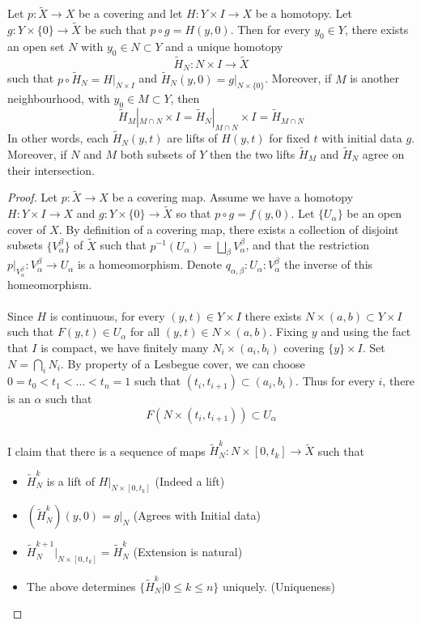 \documentclass[a4paper]{article}
\begin{document}
\begin{lmm}{}{} Let $p:\tilde{X}\to X$ be a covering and let $H:Y\times I\to X$ be a homotopy. Let $g:Y\times\{0\}\to\tilde{X}$ be such that $p\circ g=H(y,0)$. Then for every $y_0\in Y$, there exists an open set $N$ with $y_0\in N\subset Y$ and a unique homotopy $$\tilde{H}_N:N\times I\to\tilde{X}$$ such that $p\circ\tilde{H}_N=H|_{N\times I}$ and $\tilde{H}_N(y,0)=g|_{N\times\{0\}}$. Moreover, if $M$ is another neighbourhood, with $y_0\in M\subset Y$, then $$\tilde{H}_M|_{M\cap N}\times I=\tilde{H}_N|_{M\cap N}\times I=\tilde{H}_{M\cap N}$$
In other words, each $\tilde{H}_N(y,t)$ are lifts of $H(y,t)$ for fixed $t$ with initial data $g$. Moreover, if $N$ and $M$ both subsets of $Y$ then the two lifts $\tilde{H}_M$ and $\tilde{H}_N$ agree on their intersection. \tcbline
\begin{proof}
Let $p:\tilde{X}\to X$ be a covering map. Assume we have a homotopy $H:Y\times I\to X$ and $g:Y\times\{0\}\to\tilde{X}$ so that $p\circ g=f(y,0)$. Let $\{U_\alpha\}$ be an open cover of $X$. By definition of a covering map, there exists a collection of disjoint subsets $\{V_\alpha^\beta\}$ of $\tilde{X}$ such that $p^{-1}(U_\alpha)=\bigsqcup_{\beta}V_{\alpha}^\beta$, and that the restriction $p|_{V_\alpha^\beta}:V_\alpha^\beta\to U_\alpha$ is a homeomorphism. Denote $q_{\alpha,\beta}:U_\alpha:V_\alpha^\beta$ the inverse of this homeomorphism. \\~\\
Since $H$ is continuous, for every $(y,t)\in Y\times I$ there exists $N\times(a,b)\subset Y\times I$ such that $F(y,t)\in U_\alpha$ for all $(y,t)\in N\times(a,b)$. Fixing $y$ and using the fact that $I$ is compact, we have finitely many $N_i\times(a_i,b_i)$ covering $\{y\}\times I$. Set $N=\bigcap_iN_i$. By property of a Lesbegue cover, we can choose $0=t_0<t_1<\dots<t_n=1$ such that $(t_i,t_{i+1})\subset (a_i,b_i)$. Thus for every $i$, there is an $\alpha$ such that $$F(N\times(t_i,t_{i+1}))\subset U_\alpha$$~\\
I claim that there is a sequence of maps $\tilde{H}_N^k:N\times[0,t_k]\to\tilde{X}$ such that 
\begin{itemize}
\item $\tilde{H}_N^k$ is a lift of $H|_{N\times[0,t_k]}$ (Indeed a lift)
\item $(\tilde{H}_N^k)(y,0)=g|_N$ (Agrees with Initial data)
\item $\tilde{H}_N^{k+1}|_{N\times[0,t_k]}=\tilde{H}_N^k$ (Extension is natural)
\item The above determines $\{\tilde{H}_N^k|0\leq k\leq n\}$ uniquely. (Uniqueness)

\end{itemize}
\end{proof}
\end{lmm}
\end{document}
